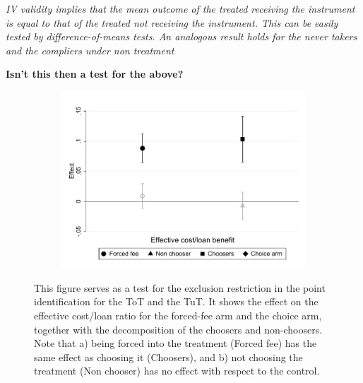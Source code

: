 \documentclass[oneside,11pt]{article}
\begin{document}
\textit{IV validity implies that the mean outcome of the treated receiving the instrument is equal to that of the treated not receiving the instrument. This can be easily tested by difference-of-means tests. An analogous result holds for the never takers and the compliers under non treatment}


\textbf{Isn't this then a test for the above?}



\begin{figure}[H]
     \caption{Exclusion restriction}
     \label{exclusion_restriction}
    \begin{center}
    \begin{subfigure}{0.6\textwidth}
        \centering
        \includegraphics[width=\textwidth]{Figuras/exclusion_restriction.pdf}
    \end{subfigure}
    \end{center}
    \scriptsize This figure serves as a test for the exclusion restriction in the point identification for the ToT and the TuT. It shows the effect on the effective cost/loan ratio for the forced-fee arm and the choice arm, together with the decomposition of the choosers and non-choosers. Note that a) being forced into the treatment (Forced fee) has the same effect as choosing it (Choosers), and b) not choosing the treatment (Non chooser) has no effect with respect to the control.
    
\end{figure}
\end{document}
